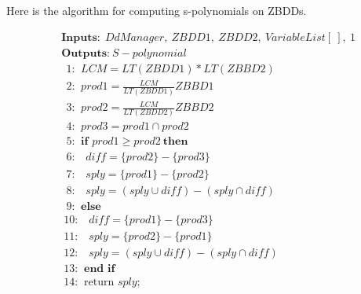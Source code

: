 \documentclass[letterpaper, 10 pt, conference]{ieeeconf}
\begin{document}
Here is the algorithm for computing s-polynomials on ZBDDs.

{\small
\begin{align*}
&\textbf{Inputs:}\ \ DdManager,\ ZBDD1,\ ZBDD2,\ VariableList[\ ],\ 1 \\
&\textbf{Outputs:}\ S-polynomial \\
&\ \ \text{1: }\ LCM = LT(ZBDD1)*LT(ZBBD2) \\
&\ \ \text{2: }\ prod1 = \frac{LCM}{LT(ZBDD1)}ZBBD1 \\
&\ \ \text{3: }\ prod2 = \frac{LCM}{LT(ZBDD2)}ZBBD2 \\
&\ \ \text{4: }\ prod3 = prod1 \cap prod2 \\
&\ \ \text{5: }\ \textbf{if } prod1 \ge prod2\ \textbf{then} \\
&\ \ \text{6: }\ \ \ diff = \{prod2\} - \{prod3\} \\
&\ \ \text{7: }\ \ \ sply = \{prod1\} - \{prod2\} \\
&\ \ \text{8: }\ \ \ sply = \left(sply \cup diff\right) - \left(sply \cap diff\right) \\
&\ \ \text{9: }\ \textbf{else } \\
&\ \text{10: }\ \ \ diff = \{prod1\} - \{prod3\} \\
&\ \text{11: }\ \ \ sply = \{prod2\} - \{prod1\} \\
&\ \text{12: }\ \ \ sply = \left(sply \cup diff\right) - \left(sply \cap diff\right) \\
&\ \text{13: }\ \textbf{end if } \\
&\ \text{14: }\ \text{return } sply; \\
\end{align*}
\par}
\end{document}
